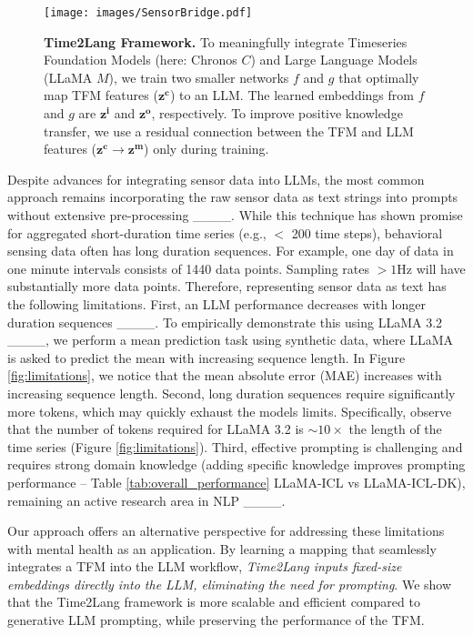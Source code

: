 \begin{figure*}
    \centering
    \texttt{[image: images/SensorBridge.pdf]}
    \caption{\textbf{Time2Lang Framework.} To meaningfully integrate Timeseries Foundation Models  (here: Chronos $C$) and Large Language Models (LLaMA $M$), we train two smaller networks $f$ and $g$ that optimally map TFM features ($\mathbf{z^c}$) to an LLM. The learned embeddings from $f$ and $g$ are $\mathbf{z^i}$ and $\mathbf{z^o}$, respectively. To improve positive knowledge transfer, we use a residual connection between the TFM and LLM features ($\mathbf{z^c} \rightarrow \mathbf{z^m}$) only during training.}
    \label{fig:Time2Lang}
\end{figure*}

Despite advances for integrating sensor data into LLMs, the most common approach remains incorporating the raw sensor data as text strings into prompts without extensive pre-processing ____. While this technique has shown promise for aggregated short-duration time series (e.g., $<$ 200 time steps), behavioral sensing data often has long duration sequences. For example, one day of data in one minute intervals consists of 1440 data points. Sampling rates $>1$Hz will have substantially more data points. Therefore, representing sensor data as text has the following limitations. First, an LLM performance decreases with longer duration sequences ____. To empirically demonstrate this using LLaMA 3.2 ____, we perform a mean prediction task using synthetic data, where LLaMA is asked to predict the mean with increasing sequence length. In Figure \ref{fig:limitations}, we notice that the mean absolute error (MAE) increases with increasing sequence length. Second, long duration sequences require significantly more tokens, which may quickly exhaust the models limits. Specifically, observe that the number of tokens required for LLaMA 3.2 is $\sim 10\times$ the length of the time series (Figure \ref{fig:limitations}). Third, effective prompting is challenging and requires strong domain knowledge (adding specific knowledge improves prompting performance -- Table \ref{tab:overall_performance} LLaMA-ICL vs LLaMA-ICL-DK), remaining an active research area in NLP ____.

Our approach offers an alternative perspective for addressing these limitations with mental health as an application. By learning a mapping that seamlessly integrates a TFM into the LLM workflow, \textit{Time2Lang inputs fixed-size embeddings directly into the LLM, eliminating the need for prompting}. We show that the Time2Lang framework is more scalable and efficient compared to generative LLM prompting, while preserving the performance of the TFM.